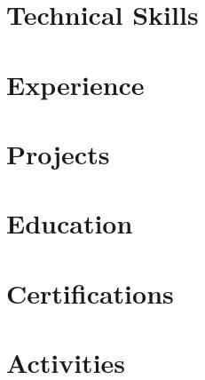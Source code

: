 \documentclass[10pt]{article}
\begin{document}
\pagestyle{others}\thispagestyle{first_page}



\section{Technical Skills}


\section{Experience}


\newpage
\section{Projects}


\section{Education}


\section{Certifications}


\section{Activities}

\end{document}
